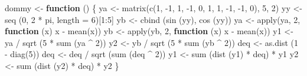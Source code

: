 \documentclass[
  12pt,
  letterpaper,
  DIV=11,
  numbers=noendperiod]{scrreprt}
\newenvironment{Shaded}{\begin{snugshade}}{\end{snugshade}}
\newcommand{\AttributeTok}[1]{\textcolor[rgb]{0.40,0.45,0.13}{#1}}
\newcommand{\ControlFlowTok}[1]{\textcolor[rgb]{0.00,0.23,0.31}{\textbf{#1}}}
\newcommand{\DecValTok}[1]{\textcolor[rgb]{0.68,0.00,0.00}{#1}}
\newcommand{\FunctionTok}[1]{\textcolor[rgb]{0.28,0.35,0.67}{#1}}
\newcommand{\NormalTok}[1]{\textcolor[rgb]{0.00,0.23,0.31}{#1}}
\newcommand{\OtherTok}[1]{\textcolor[rgb]{0.00,0.23,0.31}{#1}}
\newcommand{\SpecialCharTok}[1]{\textcolor[rgb]{0.37,0.37,0.37}{#1}}
\theoremstyle{remark}
\begin{document}
\begin{Shaded}
\begin{Highlighting}[]
\NormalTok{dommy }\OtherTok{\textless{}{-}} \ControlFlowTok{function}\NormalTok{ () \{}
\NormalTok{  ya }\OtherTok{\textless{}{-}} \FunctionTok{matrix}\NormalTok{(}\FunctionTok{c}\NormalTok{(}\DecValTok{1}\NormalTok{, }\SpecialCharTok{{-}}\DecValTok{1}\NormalTok{, }\DecValTok{1}\NormalTok{, }\SpecialCharTok{{-}}\DecValTok{1}\NormalTok{, }\DecValTok{0}\NormalTok{, }\DecValTok{1}\NormalTok{, }\DecValTok{1}\NormalTok{, }\SpecialCharTok{{-}}\DecValTok{1}\NormalTok{, }\SpecialCharTok{{-}}\DecValTok{1}\NormalTok{, }\DecValTok{0}\NormalTok{), }\DecValTok{5}\NormalTok{, }\DecValTok{2}\NormalTok{)}
\NormalTok{  yy }\OtherTok{\textless{}{-}} \FunctionTok{seq}\NormalTok{ (}\DecValTok{0}\NormalTok{, }\DecValTok{2} \SpecialCharTok{*}\NormalTok{ pi, }\AttributeTok{length =} \DecValTok{6}\NormalTok{)[}\DecValTok{1}\SpecialCharTok{:}\DecValTok{5}\NormalTok{]}
\NormalTok{  yb }\OtherTok{\textless{}{-}} \FunctionTok{cbind}\NormalTok{ (}\FunctionTok{sin}\NormalTok{ (yy), }\FunctionTok{cos}\NormalTok{ (yy))}
\NormalTok{  ya }\OtherTok{\textless{}{-}} \FunctionTok{apply}\NormalTok{(ya, }\DecValTok{2}\NormalTok{, }\ControlFlowTok{function}\NormalTok{ (x)}
\NormalTok{    x }\SpecialCharTok{{-}} \FunctionTok{mean}\NormalTok{(x))}
\NormalTok{  yb }\OtherTok{\textless{}{-}} \FunctionTok{apply}\NormalTok{(yb, }\DecValTok{2}\NormalTok{, }\ControlFlowTok{function}\NormalTok{ (x)}
\NormalTok{    x }\SpecialCharTok{{-}} \FunctionTok{mean}\NormalTok{(x))}
\NormalTok{  y1 }\OtherTok{\textless{}{-}}\NormalTok{ ya }\SpecialCharTok{/} \FunctionTok{sqrt}\NormalTok{ (}\DecValTok{5} \SpecialCharTok{*} \FunctionTok{sum}\NormalTok{ (ya }\SpecialCharTok{\^{}} \DecValTok{2}\NormalTok{))}
\NormalTok{  y2 }\OtherTok{\textless{}{-}}\NormalTok{ yb }\SpecialCharTok{/} \FunctionTok{sqrt}\NormalTok{ (}\DecValTok{5} \SpecialCharTok{*} \FunctionTok{sum}\NormalTok{ (yb }\SpecialCharTok{\^{}} \DecValTok{2}\NormalTok{))}
\NormalTok{  deq }\OtherTok{\textless{}{-}} \FunctionTok{as.dist}\NormalTok{ (}\DecValTok{1} \SpecialCharTok{{-}} \FunctionTok{diag}\NormalTok{(}\DecValTok{5}\NormalTok{))}
\NormalTok{  deq }\OtherTok{\textless{}{-}}\NormalTok{ deq }\SpecialCharTok{/} \FunctionTok{sqrt}\NormalTok{ (}\FunctionTok{sum}\NormalTok{ (deq }\SpecialCharTok{\^{}} \DecValTok{2}\NormalTok{))}
\NormalTok{  y1 }\OtherTok{\textless{}{-}} \FunctionTok{sum}\NormalTok{ (}\FunctionTok{dist}\NormalTok{ (y1) }\SpecialCharTok{*}\NormalTok{ deq) }\SpecialCharTok{*}\NormalTok{ y1}
\NormalTok{  y2 }\OtherTok{\textless{}{-}} \FunctionTok{sum}\NormalTok{ (}\FunctionTok{dist}\NormalTok{ (y2) }\SpecialCharTok{*}\NormalTok{ deq) }\SpecialCharTok{*}\NormalTok{ y2}
\NormalTok{\}}


\end{Highlighting}
\end{Shaded}
\end{document}
